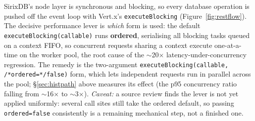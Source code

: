 \documentclass[11pt,a4paper,oneside]{report}
\theoremstyle{sirixthm}
\newcommand{\code}[1]{\texttt{#1}}
\begin{document}
SirixDB's node layer is synchronous and blocking, so every database operation is pushed off the
event loop with Vert.x's \code{executeBlocking} (Figure~\ref{fig:restflow}). The decisive performance lever is \emph{which}
form is used: the default \code{executeBlocking(callable)} runs \textbf{ordered}, serialising all
blocking tasks queued on a context FIFO, so concurrent requests sharing a context execute
one-at-a-time on the worker pool, the root cause of the $\sim$20$\times$ latency-under-concurrency
regression. The remedy is the two-argument \code{executeBlocking(callable, /*ordered=*/false)} form,
which lets independent requests run in parallel across the pool; \S\ref{sec:histpath} above measures
its effect (the p95 concurrency ratio falling from $\sim$16$\times$ to $\sim$3$\times$). \emph{Caveat:}
a source review finds the lever is not yet applied uniformly: several call sites still take the
ordered default, so passing \code{ordered=false} consistently is a remaining mechanical step, not
a finished one.
\end{document}

